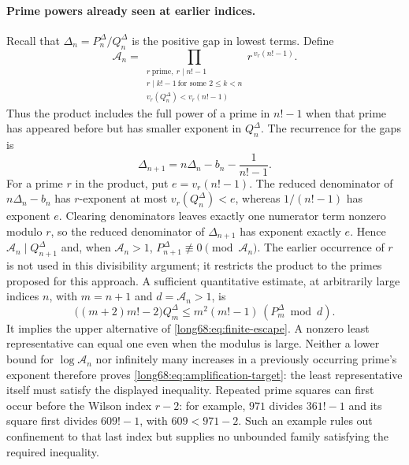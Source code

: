\documentclass[11pt]{article}
\begin{document}
\paragraph{Prime powers already seen at earlier indices.}
Recall that $\Delta_n=P^\Delta_n/Q^\Delta_n$ is the positive gap in lowest terms. Define
\[
 \mathcal A_n=\prod_{\substack{r\ \mathrm{prime},\ r\mid n!-1\\
     r\mid k!-1\ \text{for some }2\le k<n\\
     v_r(Q^\Delta_n)<v_r(n!-1)}}r^{\,v_r(n!-1)} .
\]
Thus the product includes the full power of a prime in $n!-1$ when that
prime has appeared before but has smaller exponent in $Q^\Delta_n$.
The recurrence for the gaps is
\[
 \Delta_{n+1}=n\Delta_n-b_n-\frac1{n!-1}.
\]
For a prime $r$ in the product, put $e=v_r(n!-1)$. The reduced denominator
of $n\Delta_n-b_n$ has $r$-exponent at most $v_r(Q^\Delta_n)<e$, whereas
$1/(n!-1)$ has exponent $e$. Clearing denominators leaves exactly one
numerator term nonzero modulo $r$, so the reduced denominator of
$\Delta_{n+1}$ has exponent exactly $e$. Hence
$\mathcal A_n\mid Q^\Delta_{n+1}$ and, when $\mathcal A_n>1$,
$P^\Delta_{n+1}\not\equiv0\pmod{\mathcal A_n}$.
The earlier occurrence of $r$ is not used in this divisibility argument;
it restricts the product to the primes proposed for this approach.
A sufficient quantitative estimate, at arbitrarily large indices $n$,
with $m=n+1$ and $d=\mathcal A_n>1$, is
\begin{equation}\label{long68:eq:amplification-target}
 \bigl((m+2)m!-2\bigr)Q^\Delta_m
 \le m^2(m!-1)\,(P^\Delta_m\bmod d).
\end{equation}
It implies the upper alternative of \eqref{long68:eq:finite-escape}. A nonzero
least representative can equal one even when the modulus is large.
Neither a lower bound for $\log\mathcal A_n$ nor infinitely many increases
in a previously occurring prime's exponent therefore proves
\eqref{long68:eq:amplification-target}: the least representative itself
must satisfy the displayed inequality. Repeated prime squares
can first occur before the Wilson index $r-2$: for example, $971$ divides
$361!-1$ and its square first divides $609!-1$, with $609<971-2$. Such an
example rules out confinement to that last index but supplies no unbounded
family satisfying the required inequality.
\end{document}
